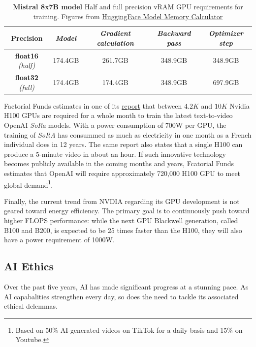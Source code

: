 \begin{table}[htp!]
  \caption{\textbf{ Mistral 8x7B model} Half and full precision vRAM GPU requirements for training. Figures from \href{https://huggingface.co/docs/accelerate/main/en/usage_guides/model_size_estimator}{HuggingFace Model Memory Calculator}}
  \label{tab:gs-mistral_requirement}
  \centering
  \begin{adjustbox}{width=\linewidth}
  \begin{tabular}[h]{c||cccc}
  \hline 
   Precision &  \textit{Model} & \textit{Gradient calculation} & \textit{Backward pass} & \textit{Optimizer step} \\
  \hline 
  \textbf{float16} \textit{(half)} & 174.4GB  & 261.7GB & 348.9GB & 348.9GB\\
  \textbf{float32} \textit{(full)} &  174.4GB  & 174.4GB & 348.9GB & 697.9GB \\
  \hline 
  \end{tabular}
  \end{adjustbox}
\end{table}
Factorial Funds estimates in one of its \href{https://www.factorialfunds.com/blog/under-the-hood-how-openai-s-sora-model-works}{report} that between $4.2K$ and $10K$ Nvidia H100 \ac{GPU}s are required for a whole month to train the latest text-to-video OpenAI \textit{SoRa} models. With a power consumption of 700W  per \ac{GPU}, the training of \textit{SoRA} has consummed as much as electricity in one month as a French individual does in 12 years. The same report also states that a single H100 can produce a 5-minute video in about an hour. If such innovative technology becomes publicly available in the coming months and years, Fcatorial Funds estimates that OpenAI will require approximately 720,000 H100 \ac{GPU} to meet global demand\footnote{Based on 50\% \ac{AI}-generated videos on TikTok for a daily basis and 15\% on Youtube.}. 

Finally, the current trend from NVDIA regarding its \ac{GPU} development is not geared toward energy efficiency. The primary goal is to continuously push toward higher FLOPS performance: while the next \ac{GPU} Blackwell generation, called B100 and B200, is expected to be 25 times faster than the H100, they will also have a power requirement of 1000W. 


\subsection{AI Ethics} 

Over the past five years, \ac{AI} has made significant progress at a stunning pace. As \ac{AI} capabalities strengthen every day, so does the need to tackle its associated ethical delemmas. 


